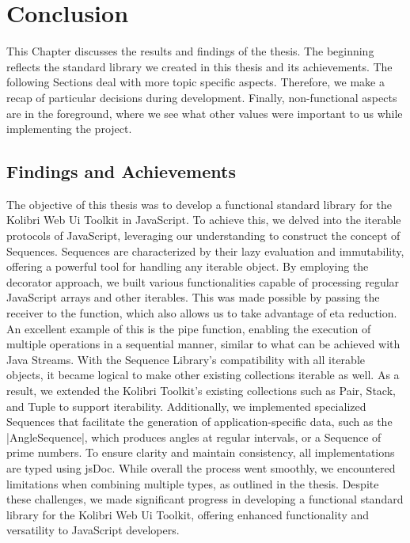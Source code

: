 \section{Conclusion}
\label{sec:conclusion}
This Chapter discusses the results and findings of the thesis. The beginning reflects the
standard library we created in this thesis and its achievements. The following
Sections deal with more topic specific aspects. Therefore, we make a
recap of particular decisions during development. Finally, non-functional
aspects are in the foreground, where we see what other values were important to
us while implementing the project.

\subsection{Findings and Achievements}
\label{sub:Findings and Achievements}
The objective of this thesis was to develop a functional standard library for
the Kolibri Web Ui Toolkit in JavaScript. To achieve this, we delved into the
iterable protocols of JavaScript, leveraging our understanding to construct the
concept of Sequences. Sequences are characterized by their lazy evaluation and
immutability, offering a powerful tool for handling any iterable object. By
employing the decorator approach, we built various functionalities capable of
processing regular JavaScript arrays and other iterables. This was made
possible by passing the receiver to the function, which also allows us to take
advantage of eta reduction.
\newline
An excellent example of this is the pipe function, enabling the execution of
multiple operations in a sequential manner, similar to what can be achieved
with Java Streams. With the Sequence Library's compatibility with all iterable
objects, it became logical to make other existing collections iterable as well.
As a result, we extended the Kolibri Toolkit's existing collections such as
Pair, Stack, and Tuple to support iterability. Additionally, we implemented
specialized Sequences that facilitate the generation of application-specific
data, such as the |AngleSequence|, which produces angles at regular intervals,
or a Sequence of prime numbers.
\newline
To ensure clarity and maintain consistency, all implementations are typed using
jsDoc. While overall the process went smoothly, we encountered limitations when
combining multiple types, as outlined in the thesis. Despite these challenges,
we made significant progress in developing a functional standard library for
the Kolibri Web Ui Toolkit, offering enhanced functionality and versatility to
JavaScript developers.

